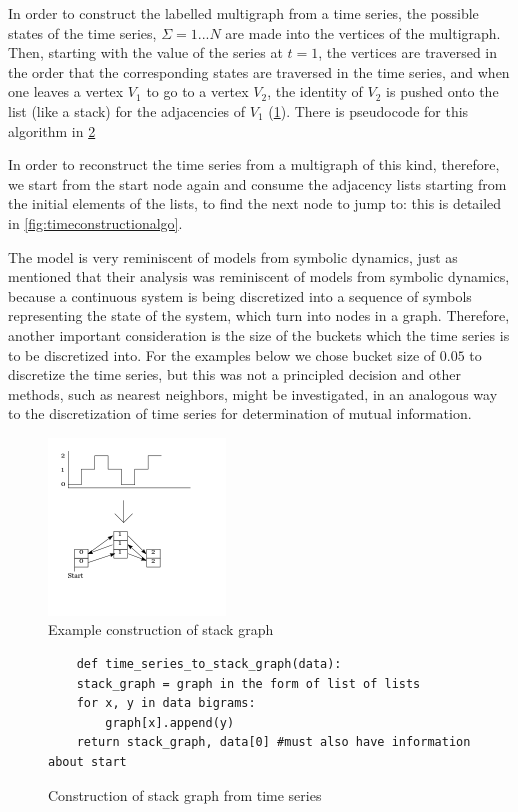 \documentclass[12pt]{article}
\begin{document}
In order to construct the labelled multigraph from a time series, the possible states of the time series, $\Sigma = {1 ... N}$ are made into the vertices of the multigraph. Then, starting with the value of the series at $t =1$, the vertices are traversed in the order that the corresponding states are traversed in the time series, and when one leaves a vertex $V_1$ to go to a vertex $V_2$, the identity of $V_2$ is pushed onto the list (like a stack) for the adjacencies of $V_1$ (\ref{fig:stackgraph}). There is pseudocode for this algorithm in \ref{fig:stackconstructionalgo}

In order to reconstruct the time series from a multigraph of this kind, therefore, we start from the start node again and consume the adjacency lists starting from the initial elements of the lists, to find the next node to jump to: this is detailed in \ref{fig:timeconstructionalgo}.

The model is very reminiscent of models from symbolic dynamics, just as \cite{campanharo} mentioned that their analysis was reminiscent of models from symbolic dynamics, because a continuous system is being discretized into a sequence of symbols representing the state of the system, which turn into nodes in a graph. Therefore, another important consideration is the size of the buckets which the time series is to be discretized into. For the examples below we chose bucket size of $0.05$ to discretize the time series, but this was not a principled decision and other methods, such as nearest neighbors, might be investigated, in an analogous way to the discretization of time series for determination of mutual information\cite{nnmi}.

\begin{figure}\label{fig:stackgraph}
  \begin{center}
    \includegraphics[scale=0.6]{stack_graph_ex}
  \end{center}
  \caption{Example construction of stack graph}
\end{figure}

\begin{figure}\label{fig:stackconstructionalgo}
  \begin{singlespace}
    \begin{verbatim}
    def time_series_to_stack_graph(data):
    stack_graph = graph in the form of list of lists
    for x, y in data bigrams:
        graph[x].append(y)
    return stack_graph, data[0] #must also have information about start
    \end{verbatim}
  \end{singlespace}
  \caption{Construction of stack graph from time series}
\end{figure}
\end{document}
